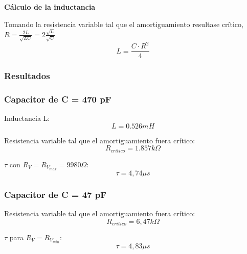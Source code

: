 \documentclass{article}
\begin{document}
            \textbf{Cálculo de la inductancia} \par \par
            Tomando la resistencia variable tal que el amortiguamiento resultase crítico,
            $ R = \frac{2L}{\sqrt{LC}} = 2\frac{\sqrt{L}}{\sqrt{C}} $
            \begin{equation}
                L = \frac{C \cdot R^2}{4}
            \end{equation}

            
        \subsubsection*{Resultados}

            \subsubsection*{Capacitor de C = 470 pF}
                Inductancia L:
                \begin{equation*}
                    L=0.526mH
                \end{equation*} \par
                
                Resistencia variable tal que el amortiguamiento fuera crítico:
                \begin{equation*}
                    R_{critico} = 1.857 k\Omega
            \end{equation*} \par
                
                $ \tau $ con $ R_V = R_{V_{max}} = 9980 \Omega $:
                 \begin{equation*}
                    \tau = 4,74 \mu s 
                \end{equation*}

            \subsubsection*{Capacitor de C = 47 pF}
                Resistencia variable tal que el amortiguamiento fuera crítico:
                \begin{equation*}
                    R_{critico} = 6,47 k\Omega 
                \end{equation*} \par
                
                $ \tau $ para $ R_V = R_{V_{min}} $: 
                \begin{equation*}
                    \tau = 4,83 \mu s 
                \end{equation*} \par
                
\end{document}
